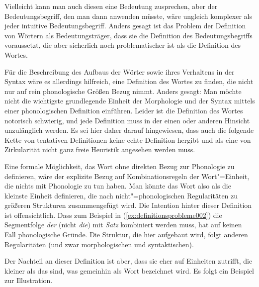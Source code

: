 \begin{exe}
\end{exe}

Vielleicht kann man auch diesen eine Bedeutung zusprechen, aber der Bedeutungsbegriff, den man dann anwenden müsste, wäre ungleich komplexer als jeder intuitive Bedeutungsbegriff.
Anders gesagt ist das Problem der Definition von Wörtern als Bedeutungsträger, dass sie die Definition des Bedeutungsbegriffs voraussetzt, die aber sicherlich noch problematischer ist als die Definition des Wortes.

Für die Beschreibung des Aufbaus der Wörter sowie ihres Verhaltens in der Syntax wäre es allerdings hilfreich, eine Definition des Wortes zu finden, die nicht nur auf rein phonologische Größen Bezug nimmt.
Anders gesagt:
Man möchte nicht die wichtigste grundlegende Einheit der Morphologie und der Syntax mittels einer phonologischen Definition einführen.
Leider ist die Definition des Wortes notorisch schwierig, und jede Definition muss in der einen oder anderen Hinsicht unzulänglich werden.
Es sei hier daher darauf hingewiesen, dass auch die folgende Kette von tentativen Definitionen keine echte Definition hergibt und als eine von Zirkularität nicht ganz freie Heuristik angesehen werden muss.

Eine formale Möglichkeit, das Wort ohne direkten Bezug zur Phonologie zu definieren, wäre der explizite Bezug auf Kombinationsregeln der Wort"=Einheit, die nichts mit Phonologie zu tun haben.
Man könnte das Wort also als die kleinste Einheit definieren, die nach nicht"=phonologischen Regularitäten zu größeren Strukturen zusammengefügt wird.
Die Intention hinter dieser Definition ist offensichtlich.
Dass zum Beispiel in (\ref{ex:definitionsprobleme002}) die Segmentfolge \textit{der} (nicht \textit{die}) mit \textit{Satz} kombiniert werden muss, hat auf keinen Fall phonologische Gründe.
Die Struktur, die hier aufgebaut wird, folgt anderen Regularitäten (und zwar morphologischen und syntaktischen).

\begin{exe}
  \ex\label{ex:definitionsprobleme002}
  \begin{xlist}
  \end{xlist}
\end{exe}

Der Nachteil an dieser Definition ist aber, dass sie eher auf Einheiten zutrifft, die kleiner als das sind, was gemeinhin als Wort bezeichnet wird.
Es folgt ein Beispiel zur Illustration.

